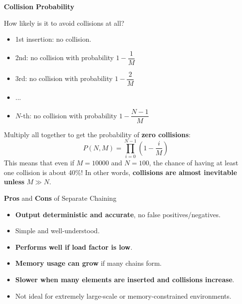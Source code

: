 \highspace
\begin{flushleft}
    \textcolor{Red2}{ \textbf{Collision Probability}}
\end{flushleft}
How likely is it to avoid collisions at all?
\begin{itemize}
    \item 1st insertion: no collision.
    \item 2nd: no collision with probability $1 - \dfrac{1}{M}$
    \item 3rd: no collision with probability $1 - \dfrac{2}{M}$
    \item ...
    \item $N$-th: no collision with probability $1 - \dfrac{N-1}{M}$
\end{itemize}
Multiply all together to get the probability of \textbf{zero collisions}:
\begin{equation}
    P\left(N, M\right) = \displaystyle\prod_{i=0}^{N-1} \left(1 - \dfrac{i}{M}\right)
\end{equation}
This means that even if $M = 10000$ and $N = 100$, the chance of having at least one collision is about 40\%! In other words, \textbf{collisions are almost inevitable unless} $M \gg N$.

\highspace
\begin{flushleft}
    \textcolor{Green3}{ \textbf{Pros}} and \textcolor{Red2}{ \textbf{Cons}} of Separate Chaining
\end{flushleft}
\begin{itemize}
    \item[\textcolor{Green3}{\faIcon{check}}] \textbf{Output deterministic and accurate}, no false positives/negatives.
    \item[\textcolor{Green3}{\faIcon{check}}] Simple and well-understood.
    \item[\textcolor{Green3}{\faIcon{check}}] \textbf{Performs well if load factor is low}.
    \item[\textcolor{Red2}{\faIcon{times}}] \textbf{Memory usage can grow} if many chains form.
    \item[\textcolor{Red2}{\faIcon{times}}] \textbf{Slower when many elements are inserted and collisions increase}.
    \item[\textcolor{Red2}{\faIcon{times}}] Not ideal for extremely large-scale or memory-constrained environments.
\end{itemize}